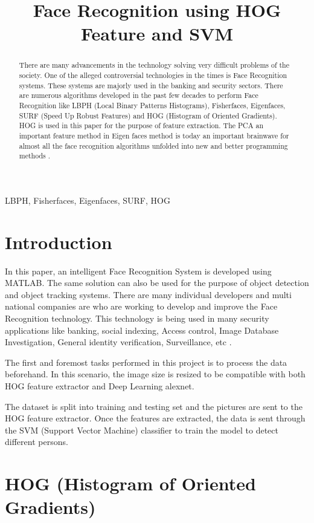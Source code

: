 \documentclass{article}
\title{Face Recognition using HOG Feature and SVM}
\begin{document}
%
\maketitle
%
\begin{abstract}
    There are many advancements in the technology solving very difficult problems of the society. One of the alleged controversial technologies in the times is Face Recognition systems. These systems are majorly used in the banking and security sectors. There are numerous algorithms developed in the past few decades to perform Face Recognition like LBPH (Local Binary Patterns Histograms), Fisherfaces, Eigenfaces, SURF (Speed Up Robust Features) and HOG (Histogram of Oriented Gradients). HOG is used in this paper for the purpose of feature extraction. The PCA an important feature method in Eigen faces method is today an important brainwave for almost all the face recognition algorithms unfolded into new and better programming methods \cite{1article}.
\end{abstract}
%
\begin{keywords}
LBPH, Fisherfaces, Eigenfaces, SURF, HOG
\end{keywords}
%
\section{Introduction}
\label{sec:intro}

In this paper, an intelligent Face Recognition System is developed using MATLAB. The same solution can also be used for the purpose of object detection and object tracking systems. There are many individual developers and multi national companies are who are working to develop and improve the Face Recognition technology. This technology is being used in many security applications like banking, social indexing, Access control, Image Database Investigation, General identity verification, Surveillance, etc \cite{2article}.

The first and foremost tasks performed in this project is to process the data beforehand. In this scenario, the image size is resized to be compatible with both HOG feature extractor and Deep Learning alexnet.

The dataset is split into training and testing set and the pictures are sent to the HOG feature extractor. Once the features are extracted, the data is sent through the SVM (Support Vector Machine) classifier to train the model to detect different persons.

\section{HOG (Histogram of Oriented Gradients)}
\label{sec:format}
\end{document}
